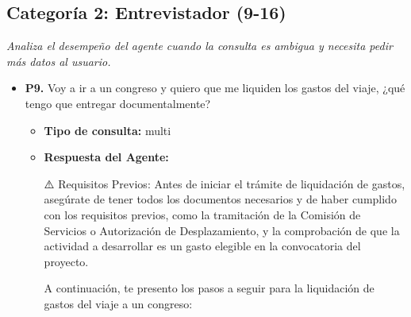 \documentclass{article}
\begin{document}
\subsection{Categoría 2: Entrevistador (9-16)}
\textit{Analiza el desempeño del agente cuando la consulta es ambigua y necesita pedir más datos al usuario.}
\begin{itemize}
  \item \textbf{P9.} Voy a ir a un congreso y quiero que me liquiden los gastos del viaje, ¿qué tengo que entregar documentalmente? \\
        \begin{itemize}
          \item \textbf{Tipo de consulta:} multi
          \item \textbf{Respuesta del Agente:}

                ⚠️ Requisitos Previos:
                Antes de iniciar el trámite de liquidación de gastos, asegúrate de tener todos los documentos necesarios y de haber cumplido con los requisitos previos, como la tramitación de la Comisión de Servicios o Autorización de Desplazamiento, y la comprobación de que la actividad a desarrollar es un gasto elegible en la convocatoria del proyecto.

                A continuación, te presento los pasos a seguir para la liquidación de gastos del viaje a un congreso:


\end{itemize}
\end{itemize}
\end{document}

